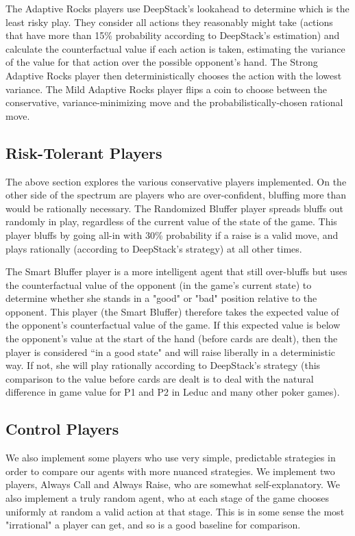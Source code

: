 \documentclass{article}
\begin{document}
\indent The Adaptive Rocks players use DeepStack's lookahead to determine which is the least risky play. They consider all actions they reasonably might take (actions that have more than 15\% probability according to DeepStack's estimation) and calculate the counterfactual value if each action is taken, estimating the variance of the value for that action over the possible opponent's hand. The Strong Adaptive Rocks player then deterministically chooses the action with the lowest variance. The Mild Adaptive Rocks player flips a coin to choose between the conservative, variance-minimizing move and the probabilistically-chosen rational move.

\subsection{Risk-Tolerant Players}
The above section explores the various conservative players implemented.  On the other side of the spectrum are players who are over-confident, bluffing more than would be rationally necessary. The Randomized Bluffer player spreads bluffs out randomly in play, regardless of the current value of the state of the game. This player bluffs by going all-in with 30\% probability if a raise is a valid move, and plays rationally (according to DeepStack's strategy) at all other times. 

\indent The Smart Bluffer player is a more intelligent agent that still over-bluffs but uses the counterfactual value of the opponent (in the game's current state) to determine whether she stands in a "good" or "bad" position relative to the opponent. This player (the Smart Bluffer) therefore takes the expected value of the opponent's counterfactual value of the game. If this expected value is below the opponent's value at the start of the hand (before cards are dealt), then the player is considered ``in a good state" and will raise liberally in a deterministic way. If not, she will play rationally according to DeepStack's strategy (this comparison to the value before cards are dealt is to deal with the natural difference in game value for P1 and P2 in Leduc and many other poker games).

\subsection{Control Players}
We also implement some players who use very simple, predictable strategies in order to compare our agents with more nuanced strategies. We implement two players, Always Call and Always Raise, who are somewhat self-explanatory. We also implement a truly random agent, who at each stage of the game chooses uniformly at random a valid action at that stage. This is in some sense the most "irrational" a player can get, and so is a good baseline for comparison.
\end{document}
